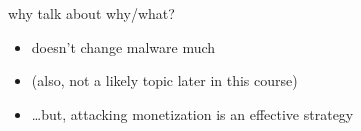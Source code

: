 
\begin{frame}{why talk about why/what?}
    \begin{itemize}
    \item doesn't change malware much
    \item (also, not a likely topic later in this course)
    \item \ldots but, attacking monetization is an effective strategy
    \end{itemize}
\end{frame}
